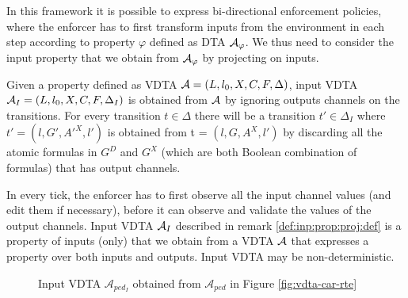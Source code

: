 In this framework it is possible to express bi-directional enforcement policies, where
the enforcer has to first transform inputs from the environment in each step according to property $\varphi$ defined as DTA ${\mathcal A}_\varphi$.
We thus need to consider the input property that we obtain from ${\mathcal A}_\varphi$ by projecting on inputs.

\begin{remark}
	\label{def:inp:prop:proj:def}
	Given a property defined as \ac{VDTA} ${\mathcal A}=\left(L, {l_0}, X, C,  F,  \Delta \right)$, input \ac{VDTA} ${\mathcal A}_{I}=\left(L, {l_0}, X,  C,  F,  \Delta_I \right)$ is obtained from ${\mathcal A}$ by ignoring outputs channels on the transitions. For every transition $t \in \Delta$ there will be a transition $t' \in \Delta_I$ where $t' = \left( l, G', A'^X, l' \right)$ is obtained from t = $\left( l, G, A^X, l' \right)$ by discarding all the atomic formulas in $G^{D}$ and $G^{X}$ (which are both Boolean combination of formulas) that has output channels.
	\end{remark}
%




In every tick, the enforcer has to first observe all the input channel values (and edit them if necessary), before it can observe and validate the values of the output channels.  
Input VDTA ${\mathcal A}_I$  described in remark \ref{def:inp:prop:proj:def} is a property of inputs (only) that we obtain from a VDTA ${\mathcal A}$ that expresses a property over both inputs and outputs. 
Input \ac{VDTA} may be non-deterministic.


\begin{figure}[tb]
	\centering
	\scalebox{1}{}
	\caption{Input VDTA $\mathcal{A}_{ped_I}$ obtained from $\mathcal{A}_{ped}$ in Figure \ref{fig:vdta-car-rte}}
	\label{fig:inp-vdta-car-rte}
	\vspace{-5mm}
\end{figure}

